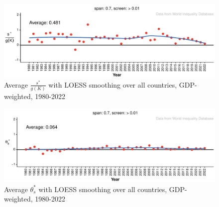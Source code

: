 \documentclass[a4paper,fleqn]{latex_styles/cas-sc}
\begin{document}
\begin{figure}[pos=H]
    \centering
        \includegraphics[width=1\textwidth]{./figure-pdf/fig-s_c_theta_plots-1.pdf}
    \captionsetup{justification=centering}
    \caption{\textcolor[HTML]{EF3B2C}{Average \(\frac{s^*}{g(K)}\)} with \textcolor[HTML]{386CB0}{LOESS smoothing} over all countries, GDP-weighted, 1980-2022} %
    \label{fig-s_c_theta_plots}
\end{figure}
%
%
\begin{figure}[pos=H]
    \centering
        \includegraphics[width=1\textwidth]{./figure-pdf/fig-si_plots-1.pdf}
    \captionsetup{justification=centering}
    \caption{\textcolor[HTML]{EF3B2C}{Average \(\theta_s^*\)} with \textcolor[HTML]{386CB0}{LOESS smoothing} over all countries, GDP-weighted, 1980-2022} %
    \label{fig-si_plots}
\end{figure}
%
\FloatBarrier

\FloatBarrier
%

\FloatBarrier

\FloatBarrier
%
\end{document}
